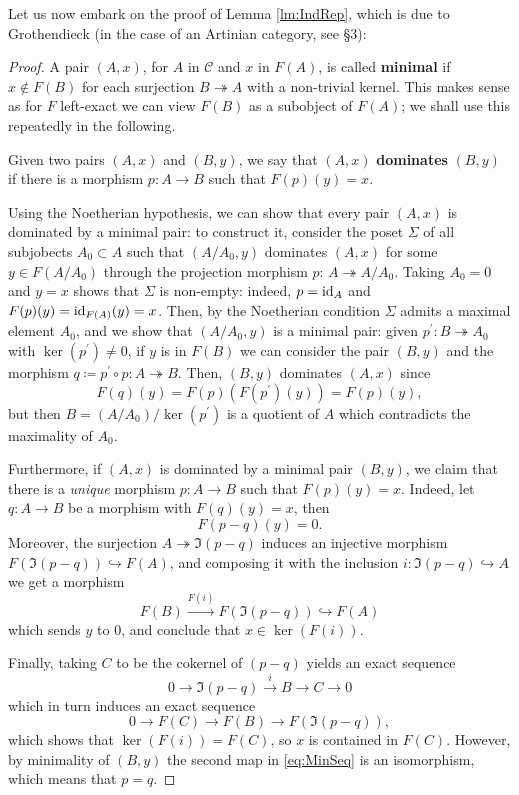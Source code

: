 \documentclass[a4paper, oneside]{memoir}
\begin{document}
Let us now embark on the proof of Lemma \ref{lm:IndRep}, which is
due to Grothendieck (in the case of an Artinian category, see \cite{Grothendieck} \S 3):
\begin{proof}A pair \((A,x)\), for \(A\) in \(\mathcal{C}\) and \(x\) in \(F(A)\), is called
	\textbf{minimal} if \(x\notin F(B)\) for each surjection \(B\twoheadrightarrow A\) with a non-trivial kernel. This makes sense as for \(F\) left-exact we can view \(F(B)\) as a subobject of \(F(A)\); we shall use this repeatedly in the following.

	Given two pairs \((A,x)\) and \((B,y)\), we say that \((A,x)\) \textbf{dominates} \((B,y)\) if there is a morphism \(p:A\to B\) such that \(F(p)(y)=x\).

	Using the Noetherian hypothesis, we can show that every pair \((A,x)\) is dominated by a minimal pair: to construct it, consider the poset \(\Sigma\) of all subjobects \(A_0 \subset A\) such that \((A/A_0,y)\) dominates \((A,x)\) for some \(y\in F(A/A_0)\)  through the projection morphism \(p:\,A\twoheadrightarrow A/A_0\).
	Taking \(A_0=0\) and \(y=x\) shows that \(\Sigma\) is non-empty: indeed, \(p=\operatorname{id}_A\) and \(F(p)(y)=\operatorname{id}_{F(A)}(y)=x\). Then, by the Noetherian condition \(\Sigma\) admits a maximal element \(A_0\), and we show that \((A/A_0,y)\) is a minimal pair: given \(p^{\prime} :B\twoheadrightarrow A_0\) with \(\ker(p^{\prime})\neq 0\), if \(y\) is in \(F(B)\) we can consider the pair \((B,y)\) and the morphism \(q\coloneqq p^{\prime} \circ p: A\twoheadrightarrow B\). Then, \((B,y)\) dominates \((A,x)\) since
	\[F(q)(y)=F(p)(F(p^{\prime} )(y))=F(p)(y),\]  but then \(B= (A/A_0)/\ker(p^{\prime})\) is a quotient of \(A\) which contradicts the maximality of \(A_0\).

	Furthermore, if \((A,x)\) is dominated by a minimal pair \((B,y)\), we claim that there is a \textit{unique} morphism \(p:A\to B\) such that \(F(p)(y)=x\).
	Indeed, let \(q:A\to B\) be a morphism with \(F(q)(y)=x\), then \[F(p-q)(y)= 0.\]
	Moreover, the surjection \(A\twoheadrightarrow\Im(p-q)\) induces an injective morphism \(F(\Im(p-q))\hookrightarrow F(A)\), and composing it with the inclusion \(i: \Im(p-q)\hookrightarrow A\) we get a morphism \[F(B)\overset{F(i)}{\to} F(\Im(p-q))\hookrightarrow F(A)\] which sends \(y\) to \(0\), and conclude that \(x\in\ker(F(i))\).

	Finally, taking \(C\) to be the cokernel of \((p-q)\) yields an exact sequence
	\begin{equation}\label{eq:MinSeq}
		0\to\Im(p-q)\overset{i}{\to} B\to C\to 0
	\end{equation}
	which in turn induces an exact sequence
	\[0\to F(C)\to F(B) \to F(\Im(p-q)),\]
	which shows that \(\ker(F(i))=F(C)\), so \(x\) is contained in \(F(C)\). However, by minimality of \((B,y)\) the second
	map in \eqref{eq:MinSeq} is an isomorphism, which means that \(p=q\).


\end{proof}
\end{document}
